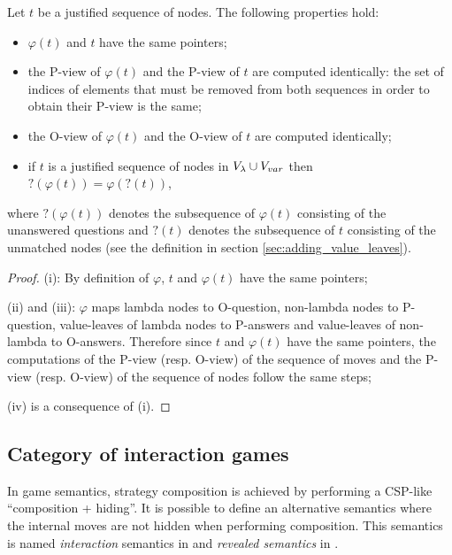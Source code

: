 \begin{property}
\label{proper:phi_pview} Let $t$ be a justified sequence of nodes. The following properties hold:
\begin{itemize}
\item[(i)] $\varphi(t)$ and $t$ have the same pointers;
\item[(ii)] the P-view of $\varphi(t)$ and the P-view of $t$ are computed
identically: the set of indices of elements that must be removed
from both sequences in order to obtain their P-view is the same;
\item[(iii)] the O-view of $\varphi(t)$ and the O-view of $t$ are computed identically;
\item[(iv)] if $t$ is a justified sequence of nodes in $V_\lambda \cup V_{var}$ then $?(\varphi(t)) =
\varphi(?(t))$,
\end{itemize}
where $?(\varphi(t))$ denotes the subsequence of $\varphi(t)$ consisting of the unanswered questions
and $?(t)$ denotes the subsequence of $t$ consisting of the unmatched nodes (see the
definition in section \ref{sec:adding_value_leaves}).
\end{property}
\begin{proof}
(i): By definition of $\varphi$, $t$ and $\varphi(t)$ have the same
pointers;

(ii) and (iii): $\varphi$ maps lambda nodes to O-question,
non-lambda nodes to P-question, value-leaves of lambda nodes to P-answers and
value-leaves of non-lambda to O-answers. Therefore since $t$ and $\varphi(t)$ have the
same pointers, the computations of the P-view (resp. O-view) of the
sequence of moves and the P-view (resp. O-view) of the sequence of
nodes follow the same steps;

(iv) is a consequence of (i).

\end{proof}


\subsection{Category of interaction games}
\label{sec:interaction_semantics}

In game semantics, strategy composition is achieved by performing a
CSP-like ``composition + hiding''. It is possible to define an
alternative semantics where the internal moves are not hidden when
performing composition. This semantics is named \emph{interaction}
semantics in \cite{DBLP:conf/sas/DimovskiGL05} and \emph{revealed
semantics} in \cite{willgreenlandthesis}.

